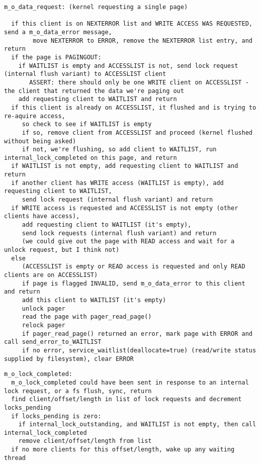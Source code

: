 \documentclass{article}
\begin{document}
\begin{verbatim}
m_o_data_request: (kernel requesting a single page)

  if this client is on NEXTERROR list and WRITE ACCESS WAS REQUESTED, send a m_o_data_error message,
        move NEXTERROR to ERROR, remove the NEXTERROR list entry, and return
  if the page is PAGINGOUT:
    if WAITLIST is empty and ACCESSLIST is not, send lock request (internal flush variant) to ACCESSLIST client
       ASSERT: there should only be one WRITE client on ACCESSLIST - the client that returned the data we're paging out
    add requesting client to WAITLIST and return
  if this client is already on ACCESSLIST, it flushed and is trying to re-aquire access,
     so check to see if WAITLIST is empty
     if so, remove client from ACCESSLIST and proceed (kernel flushed without being asked)
     if not, we're flushing, so add client to WAITLIST, run internal_lock_completed on this page, and return
  if WAITLIST is not empty, add requesting client to WAITLIST and return
  if another client has WRITE access (WAITLIST is empty), add requesting client to WAITLIST,
     send lock request (internal flush variant) and return
  if WRITE access is requested and ACCESSLIST is not empty (other clients have access),
     add requesting client to WAITLIST (it's empty),
     send lock requests (internal flush variant) and return
     (we could give out the page with READ access and wait for a unlock request, but I think not)
  else
     (ACCESSLIST is empty or READ access is requested and only READ clients are on ACCESSLIST)
     if page is flagged INVALID, send m_o_data_error to this client and return
     add this client to WAITLIST (it's empty)
     unlock pager
     read the page with pager_read_page()
     relock pager
     if pager_read_page() returned an error, mark page with ERROR and call send_error_to_WAITLIST
     if no error, service_waitlist(deallocate=true) (read/write status supplied by filesystem), clear ERROR
\end{verbatim}

\begin{verbatim}
m_o_lock_completed:
  m_o_lock_completed could have been sent in response to an internal lock request, or a fs flush, sync, return
  find client/offset/length in list of lock requests and decrement locks_pending
  if locks_pending is zero:
    if internal_lock_outstanding, and WAITLIST is not empty, then call internal_lock_completed
    remove client/offset/length from list
  if no more clients for this offset/length, wake up any waiting thread
\end{verbatim}
\end{document}
